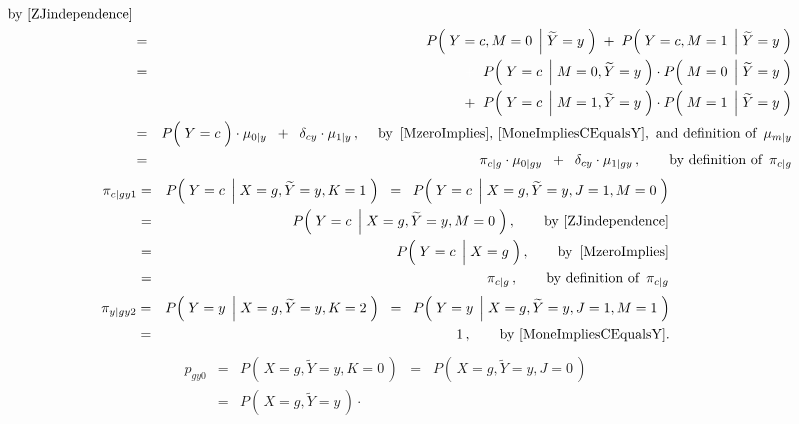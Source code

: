 \begin{enumerate}
\begin{eqnarray*}
	\quad\quad
	\textnormal{by \eqref{ZJindependence}}
\\
&=&
	P\!\left(\;Y=c,M=0\;\left\vert\;\widetilde{Y}=y\right.\,\right)
	\;+\;
	P\!\left(\;Y=c,M=1\;\left\vert\;\widetilde{Y}=y\right.\,\right)
\\
&=&
	{\color{white}+}\;\;
	P\!\left(\;Y=c\;\left\vert\;M=0,\widetilde{Y}=y\right.\,\right)
	\cdot
	P\!\left(\;M=0\;\left\vert\;\widetilde{Y}=y\right.\,\right)
\\
&&
	+\;\;
	P\!\left(\;Y=c\;\left\vert\;M=1,\widetilde{Y}=y\right.\,\right)
	\cdot
	P\!\left(\;M=1\;\left\vert\;\widetilde{Y}=y\right.\,\right)
\\
&=&
	P\!\left(\;Y\overset{{\color{white}-}}{=}c\;\right)
	\cdot
	\mu_{0 \vert y}
	\;\;+\;\;
	\delta_{cy}
	\cdot
	\mu_{1 \vert y}\,,
	\quad\;
	\textnormal{by \,\eqref{MzeroImplies}, \eqref{MoneImpliesCEqualsY},\, and definition of \,$\mu_{m \vert y}$}
\\
&=&
	\pi_{c \vert g}
	\cdot
	\mu_{0 \vert gy}
	\;\;+\;\;
	\delta_{cy}
	\cdot
	\mu_{1 \vert gy}\,,
	\quad\quad
	\textnormal{by definition of \,$\pi_{c \vert g}$}
\end{eqnarray*}
\begin{eqnarray*}
\pi_{c \vert gy1}
&=&
	P\!\left(\;Y=c\;\left\vert\;X=g,\widetilde{Y}=y,K=1\right.\,\right)
\;\;=\;\;
	P\!\left(\;Y=c\;\left\vert\;X=g,\widetilde{Y}=y,J=1,M=0\right.\,\right)
\\
&=&
	P\!\left(\;Y=c\;\left\vert\;X=g,\widetilde{Y}=y,M=0\right.\,\right),
	\quad\quad
	\textnormal{by \eqref{ZJindependence}}
\\
&=&
	P\!\left(\;Y=c\;\left\vert\;X\overset{{\color{white}-}}{=}g\right.\,\right),
	\quad\quad
	\textnormal{by \,\eqref{MzeroImplies}}
\\
&=&
	\pi_{c \vert g}\,,
	\quad\quad
	\textnormal{by definition of \,$\pi_{c \vert g}$}
\end{eqnarray*}
\begin{eqnarray*}
\pi_{y \vert gy2}
&=&
	P\!\left(\;Y=y\;\left\vert\;X=g,\widetilde{Y}=y,K=2\right.\,\right)
\;\;=\;\;
	P\!\left(\;Y=y\;\left\vert\;X=g,\widetilde{Y}=y,J=1,M=1\right.\,\right)
\\
&=&
	1\,,
	\quad\quad
	\textnormal{by \eqref{MoneImpliesCEqualsY}.}
\end{eqnarray*}
\begin{eqnarray*}
p_{gy0}
&=&
	P\!\left(\,X=g,\widetilde{Y}=y,K=0\,\right)
\;\;=\;\;
	P\!\left(\,X=g,\widetilde{Y}=y,J=0\,\right)
\\
&=&
	P\!\left(\,X=g,\widetilde{Y}=y\,\right)
	\cdot

\end{eqnarray*}
\end{enumerate}
